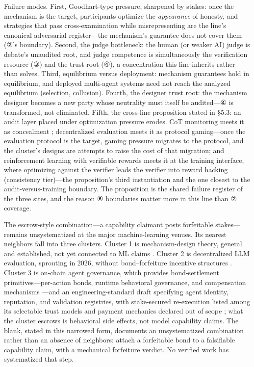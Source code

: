 \documentclass[11pt,a4paper]{article}
\begin{document}
Failure modes. First, Goodhart-type pressure, sharpened by stakes: once the mechanism is the target, participants optimize the \textit{appearance} of honesty, and strategies that pass cross-examination while misrepresenting are the line's canonical adversarial register—the mechanism's guarantee does not cover them (②'s boundary). Second, the judge bottleneck: the human (or weaker AI) judge is debate's unaudited root, and judge competence is simultaneously the verification resource (③) and the trust root (④), a concentration this line inherits rather than solves. Third, equilibrium versus deployment: mechanism guarantees hold in equilibrium, and deployed multi-agent systems need not reach the analyzed equilibrium (selection, collusion). Fourth, the designer trust root: the mechanism designer becomes a new party whose neutrality must itself be audited—④ is transformed, not eliminated. Fifth, the cross-line proposition stated in §5.3: an audit layer placed under optimization pressure erodes. CoT monitoring meets it as concealment \cite{key30}; decentralized evaluation meets it as protocol gaming—once the evaluation protocol is the target, gaming pressure migrates to the protocol, and the cluster's designs \cite{key44,key45,key46} are attempts to raise the cost of that migration; and reinforcement learning with verifiable rewards meets it at the training interface, where optimizing against the verifier leads the verifier into reward hacking \cite{key47} (consistency tier)—the proposition's third instantiation and the one closest to the audit-versus-training boundary. The proposition is the shared failure register of the three sites, and the reason ⑥ boundaries matter more in this line than ② coverage.

The escrow-style combination—a capability claimant posts forfeitable stakes—remains unsystematized at the major machine-learning venues. Its nearest neighbors fall into three clusters. Cluster 1 is mechanism-design theory, general and established, not yet connected to ML claims \cite{key43}. Cluster 2 is decentralized LLM evaluation, sprouting in 2026, without bond–forfeiture incentive structures \cite{key44,key45,key46}. Cluster 3 is on-chain agent governance, which provides bond-settlement primitives—per-action bonds, runtime behavioral governance, and compensation mechanisms \cite{key48,key49,key50}—and an engineering-standard draft specifying agent identity, reputation, and validation registries, with stake-secured re-execution listed among its selectable trust models and payment mechanics declared out of scope \cite{key51}; what the cluster escrows is behavioral side effects, not model capability claims. The blank, stated in this narrowed form, documents an unsystematized combination rather than an absence of neighbors: attach a forfeitable bond to a falsifiable capability claim, with a mechanical forfeiture verdict. No verified work has systematized that step.
\end{document}
